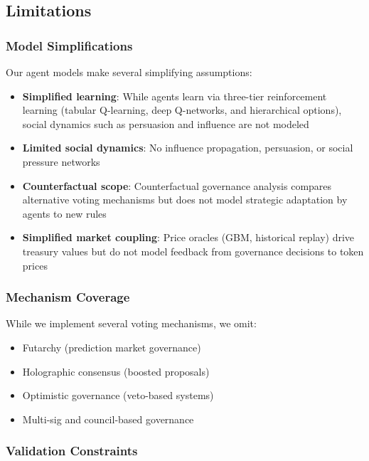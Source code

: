 
\subsection{Limitations}

\subsubsection{Model Simplifications}

Our agent models make several simplifying assumptions:

\begin{itemize}
    \item \textbf{Simplified learning}: While agents learn via three-tier reinforcement learning (tabular Q-learning, deep Q-networks, and hierarchical options), social dynamics such as persuasion and influence are not modeled
    \item \textbf{Limited social dynamics}: No influence propagation, persuasion, or social pressure networks
    \item \textbf{Counterfactual scope}: Counterfactual governance analysis compares alternative voting mechanisms but does not model strategic adaptation by agents to new rules
    \item \textbf{Simplified market coupling}: Price oracles (GBM, historical replay) drive treasury values but do not model feedback from governance decisions to token prices
\end{itemize}

\subsubsection{Mechanism Coverage}

While we implement several voting mechanisms, we omit:

\begin{itemize}
    \item Futarchy (prediction market governance)
    \item Holographic consensus (boosted proposals)
    \item Optimistic governance (veto-based systems)
    \item Multi-sig and council-based governance
\end{itemize}

\subsubsection{Validation Constraints}

